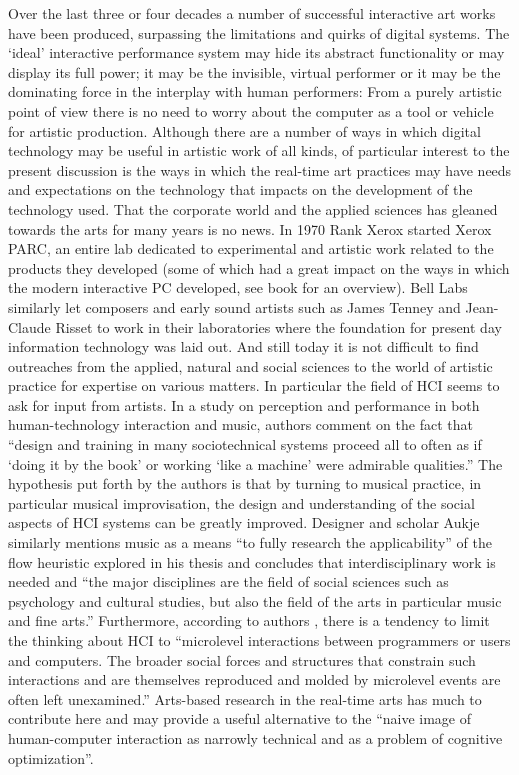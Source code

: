 Over the last three or four decades a number of successful interactive art works have been produced, surpassing the limitations and quirks of digital systems. The `ideal' interactive performance system may hide its abstract functionality or may display its full power; it may be the invisible, virtual performer or it may be the dominating force in the interplay with human performers: From a purely artistic point of view there is no need to worry about the computer as a tool or vehicle for artistic production. Although there are a number of ways in which digital technology may be useful in artistic work of all kinds, of particular interest to the present discussion is the ways in which the real-time art practices may have needs and expectations on the technology that impacts on the development of the technology used. That the corporate world and the applied sciences has gleaned towards the arts for many years is no news. In 1970 Rank Xerox started Xerox PARC, an entire lab dedicated to experimental and artistic work related to the products they developed (some of which had a great impact on the ways in which the modern interactive PC developed, see \citeauthor{johnson97} book  for an overview). Bell Labs similarly let composers and early sound artists such as James Tenney and Jean-Claude Risset to work in their laboratories where the foundation for present day information technology was laid out. And still today it is not difficult to find outreaches from the applied, natural and social sciences to the world of artistic practice for expertise on various matters. In particular the field of HCI seems to ask for input from artists. In a study on perception and performance in both human-technology interaction and music, authors \citeauthor{kirlik04} comment on the fact that ``design and training in many sociotechnical systems proceed all to often as if `doing it by the book' or working `like a machine' were admirable qualities.'' The hypothesis put forth by the authors is that by turning to musical practice, in particular musical improvisation, the design and understanding of the social aspects of HCI systems can be greatly improved. Designer and scholar Aukje \citeauthor{thomassen03} similarly mentions music as a means ``to fully research the applicability'' of the flow heuristic explored in his thesis and concludes that interdisciplinary work is needed and ``the major disciplines are the field of social sciences such as psychology and cultural studies, but also the field of the arts in particular music and fine arts.'' \parencite[239]{thomassen03} Furthermore, according to authors \citeauthor{engestrom96}, there is a tendency to limit the thinking about HCI to ``microlevel interactions between programmers or users and computers. The broader social forces and structures that constrain such interactions and are themselves reproduced and molded by microlevel events are often left unexamined.'' Arts-based research in the real-time arts has much to contribute here and may provide a useful alternative to the  ``naive image of human-computer interaction as narrowly technical and as a problem of cognitive optimization''. \parencite[325]{engestrom96} 

